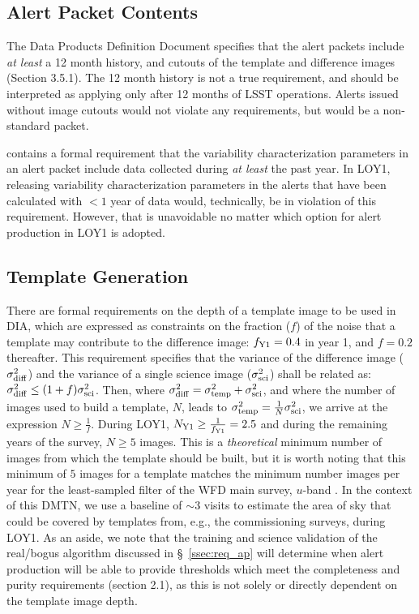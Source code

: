 \documentclass[DM,lsstdraft,toc]{lsstdoc}
\begin{document}
\subsection{Alert Packet Contents}\label{ssec:req_apc}

The Data Products Definition Document  specifies that the alert packets include {\em at least} a 12 month history, and cutouts of the template and difference images (Section 3.5.1). The 12 month history is not a true requirement, and should be interpreted as applying only after 12 months of LSST operations. Alerts issued without image cutouts would not violate any requirements, but would be a non-standard packet. 

 contains a formal requirement that the variability characterization parameters in an alert packet include data collected during {\em at least} the past year. In LOY1, releasing variability characterization parameters in the alerts that have been calculated with $<1$ year of data would, technically, be in violation of this requirement. However, that is unavoidable no matter which option for alert production in LOY1 is adopted.

\subsection{Template Generation}\label{ssec:req_temp}

There are formal requirements on the depth of a template image to be used in DIA, which are expressed as constraints on the fraction ($f$) of the noise that a template may contribute to the difference image: $f_{\rm Y1}=0.4$ in year 1, and $f=0.2$ thereafter. This requirement specifies that the variance of the difference image ($\sigma_{\rm diff}^2$) and the variance of a single science image ($\sigma_{\rm sci}^2$) shall be related as: $\sigma_{\rm diff}^2 \leq (1+f)\sigma_{\rm sci}^2$. Then, where $\sigma_{\rm diff}^2 = \sigma_{\rm temp}^2 + \sigma_{\rm sci}^2$, and where the number of images used to build a template, $N$, leads to $\sigma_{\rm temp}^2 = \frac{1}{N} \sigma_{\rm sci}^2$, we arrive at the expression $N \geq \frac{1}{f}$. During LOY1, $N_{\rm Y1} \geq \frac{1}{f_{\rm Y1}} = 2.5$ and during the remaining years of the survey, $N \geq 5$ images. This is a {\em theoretical} minimum number of images from which the template should be built, but it is worth noting that this minimum of $5$ images for a template matches the minimum number images per year for the least-sampled filter of the WFD main survey, $u$-band \citep{Ivezi__2019}. In the context of this DMTN, we use a baseline of $\sim$3 visits to estimate the area of sky that could be covered by templates from, e.g., the commissioning surveys, during LOY1. As an aside, we note that the training and science validation of the real/bogus algorithm discussed in \S~\ref{ssec:req_ap} will determine when alert production will be able to provide thresholds which meet the completeness and purity requirements (section 2.1), as this is not solely or directly dependent on the template image depth.
\end{document}
